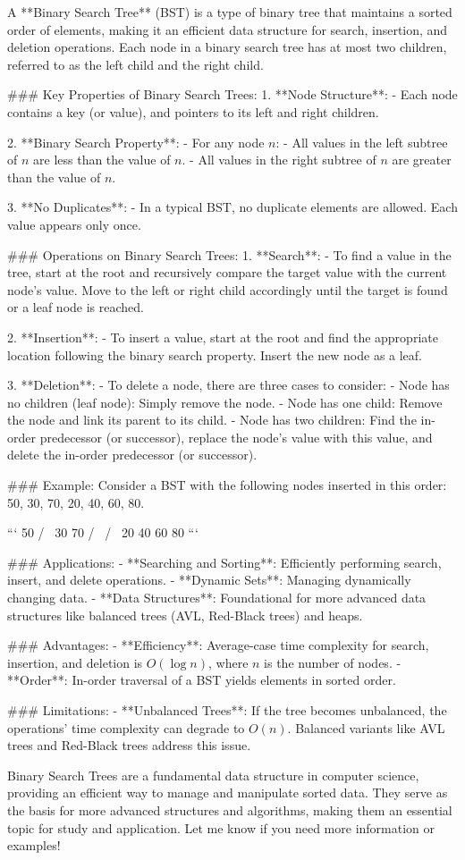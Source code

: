 A **Binary Search Tree** (BST) is a type of binary tree that maintains a sorted order of elements, making it an efficient data structure for search, insertion, and deletion operations. Each node in a binary search tree has at most two children, referred to as the left child and the right child.

### Key Properties of Binary Search Trees:
1. **Node Structure**:
   - Each node contains a key (or value), and pointers to its left and right children.

2. **Binary Search Property**:
   - For any node \( n \):
     - All values in the left subtree of \( n \) are less than the value of \( n \).
     - All values in the right subtree of \( n \) are greater than the value of \( n \).

3. **No Duplicates**:
   - In a typical BST, no duplicate elements are allowed. Each value appears only once.

### Operations on Binary Search Trees:
1. **Search**:
   - To find a value in the tree, start at the root and recursively compare the target value with the current node's value. Move to the left or right child accordingly until the target is found or a leaf node is reached.

2. **Insertion**:
   - To insert a value, start at the root and find the appropriate location following the binary search property. Insert the new node as a leaf.

3. **Deletion**:
   - To delete a node, there are three cases to consider:
     - Node has no children (leaf node): Simply remove the node.
     - Node has one child: Remove the node and link its parent to its child.
     - Node has two children: Find the in-order predecessor (or successor), replace the node's value with this value, and delete the in-order predecessor (or successor).

### Example:
Consider a BST with the following nodes inserted in this order: 50, 30, 70, 20, 40, 60, 80.

```
        50
       /  \
     30    70
    / \    / \
  20  40  60  80
```

### Applications:
- **Searching and Sorting**: Efficiently performing search, insert, and delete operations.
- **Dynamic Sets**: Managing dynamically changing data.
- **Data Structures**: Foundational for more advanced data structures like balanced trees (AVL, Red-Black trees) and heaps.

### Advantages:
- **Efficiency**: Average-case time complexity for search, insertion, and deletion is \(O(\log n)\), where \(n\) is the number of nodes.
- **Order**: In-order traversal of a BST yields elements in sorted order.

### Limitations:
- **Unbalanced Trees**: If the tree becomes unbalanced, the operations' time complexity can degrade to \(O(n)\). Balanced variants like AVL trees and Red-Black trees address this issue.

Binary Search Trees are a fundamental data structure in computer science, providing an efficient way to manage and manipulate sorted data. They serve as the basis for more advanced structures and algorithms, making them an essential topic for study and application. Let me know if you need more information or examples!